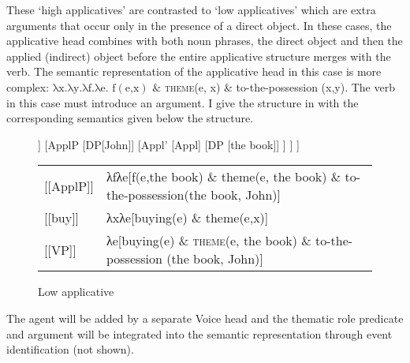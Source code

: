 \documentclass[output=paper,colorlinks,citecolor=brown,nonflat]{./langscibook}
\begin{document}

These ‘high applicatives’ are contrasted to ‘low applicatives’ which are extra arguments that occur only in the presence of a direct object. In these cases, the applicative head combines with both noun phrases, the direct object and then the applied (indirect) object before the entire applicative structure merges with the verb. The semantic representation of the applicative head in this case is more complex:  $\text{λx.λy.λf.λe}\text{. f}\left(\text{e,x}\right)\text{ \&} $  \textsc{theme}(e, x) \& to-the-possession (x,y). The verb in this case must introduce an argument. I give the structure in  with the corresponding semantics given below the structure.


\begin{figure}
	\begin{forest}
		[VP
			[V [buy]]
			[ApplP
				[DP[John]]
				[Appl'
					[Appl]
					[DP [the book]]
				]
			]
		]
	\end{forest}

	\begin{tabular}{l p{8cm}}
		{[}{[}ApplP{]}{]}  &  λfλe{[}f(e,the book) \& theme(e, the book) \& to-the-possession(the book, John){]}\\
		{[}{[}buy{]}{]} &  λxλe{[}buying(e) \& theme(e,x){]}\\
		{[}{[}VP{]}{]} &  λe{[}buying(e) \& \textsc{theme}(e, the book) \& to-the-possession (the book, John){]}
	\end{tabular}

	\caption{\label{fig:basilico:2} Low applicative}
\end{figure}


The agent will be added by a separate Voice head and the thematic role predicate and argument will be integrated into the semantic representation through event identification (not shown).
\end{document}
